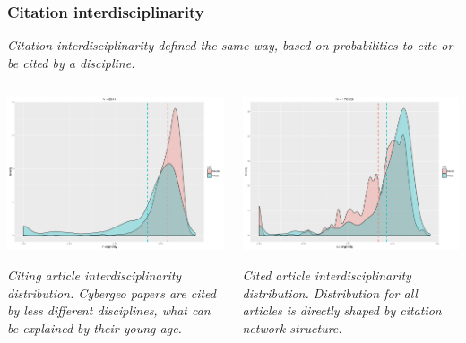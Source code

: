 \begin{frame}
\end{frame}


\begin{frame}
\frametitle{Citation interdisciplinarity}

\textit{Citation interdisciplinarity defined the same way, based on probabilities to cite or be cited by a discipline.}

\bigskip

\begin{columns}
\begin{column}{0.5\textwidth}
\includegraphics[width=\textwidth]{figures/citin_interdisc}

\textit{Citing article interdisciplinarity distribution. Cybergeo papers are cited by less different disciplines, what can be explained by their young age.}
\end{column}
\begin{column}{0.5\textwidth}
\includegraphics[width=\textwidth]{figures/citout_interdisc}

\textit{Cited article interdisciplinarity distribution. Distribution for all articles is directly shaped by citation network structure.}
\end{column}
\end{columns}
\end{frame}


